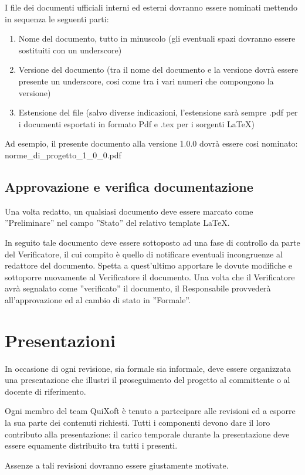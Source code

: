 \documentclass[11pt,a4paper]{article}
\begin{document}
I file dei documenti ufficiali interni ed esterni dovranno essere nominati mettendo in sequenza le seguenti parti:
\begin{enumerate}
 \item Nome del documento, tutto in minuscolo (gli eventuali spazi dovranno essere sostituiti con un underscore)
 \item Versione del documento (tra il nome del documento e la versione dovrà essere presente un underscore, cosi come tra i vari numeri che compongono la versione)
 \item Estensione del file (salvo diverse indicazioni, l'estensione sarà sempre .pdf per i documenti esportati in formato Pdf e .tex per i sorgenti \LaTeX)
\end{enumerate}
Ad esempio, il presente documento alla versione 1.0.0 dovrà essere cosi nominato: norme\_di\_progetto\_1\_0\_0.pdf


\subsection{Approvazione e verifica documentazione}
Una volta redatto, un qualsiasi documento deve essere marcato come ''Preliminare'' nel campo ''Stato'' del relativo template \LaTeX.

In seguito tale documento deve essere sottoposto ad una fase di controllo da parte del Verificatore, il cui compito è quello di notificare eventuali incongruenze al redattore del documento.
Spetta a quest'ultimo apportare le dovute modifiche e sottoporre nuovamente al Verificatore il documento.
Una volta che il Verificatore avrà segnalato come ''verificato'' il documento, il Responsabile provvederà all'approvazione ed al cambio di stato in ''Formale''.
\section{Presentazioni}
In occasione di ogni revisione, sia formale sia informale, deve essere organizzata una presentazione che illustri il proseguimento del progetto al committente o al docente di riferimento.

Ogni membro del team QuiXoft è tenuto a partecipare alle revisioni ed a esporre la sua parte dei contenuti richiesti.
Tutti i componenti devono dare il loro contributo alla presentazione: il carico temporale durante la presentazione deve essere equamente distribuito tra tutti i presenti.

Assenze a tali revisioni dovranno essere giustamente motivate.
\end{document}
